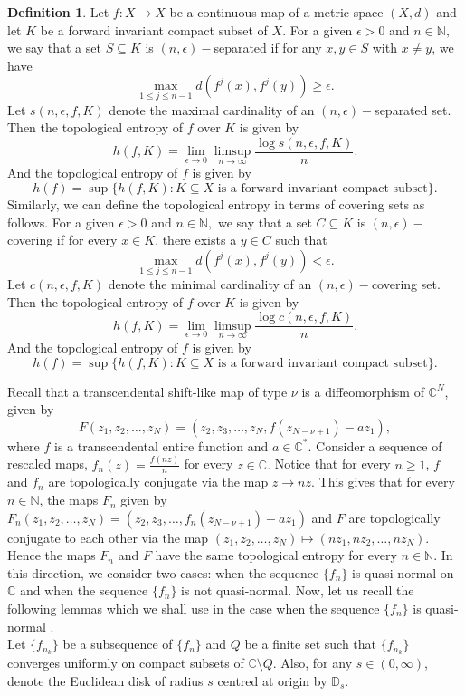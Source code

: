 \documentclass[12pt, reqno]{amsart}
\numberwithin{equation}{section}
\theoremstyle{definition}
\newtheorem{definition}{Definition}[section]
\theoremstyle{remark}
\theoremstyle{plain}
\theoremstyle{definition}
\numberwithin{equation}{section}
\begin{document}
\begin{definition}\cite{Adler, Canvos}
Let $f: X\to X$ be a continuous map of a metric space $(X, d)$ and let $K$ be a forward invariant compact subset of $X$. For a given $\epsilon >0$ and $n\in\mathbb{N},$ we say that a set $S\subseteq K$ is $(n,\epsilon)-$separated if for any $x, y\in S$ with $x\not= y$, we have 
\[\max_{1\leq j\leq n-1}d(f^{j}(x), f^j(y))\geq \epsilon.\]
Let $s(n, \epsilon, f,K)$ denote the maximal cardinality of an $(n,\epsilon)-$separated set. Then the topological entropy of $f$ over $K$ is given by 
\[h(f,K)=\lim_{\epsilon\to 0}\limsup_{n\to\infty}\frac{\log s(n, \epsilon, f,K)}{n}.\]
And the topological entropy of $f$ is given by 
\[h(f)=\sup\{h(f,K): K\subseteq X \text{ is a forward invariant compact subset}\}.\]
Similarly, we can define the topological entropy in terms of covering sets as follows.
For a given $\epsilon >0$ and $n\in\mathbb{N},$ we say that a set $C\subseteq K$ is $(n,\epsilon)-$covering if for every $x\in K$, there exists a $y\in C$ such that
\[\max_{1\leq j\leq n-1}d(f^{j}(x), f^j(y))< \epsilon.\]
Let $c(n,\epsilon, f,K)$ denote the minimal cardinality of an $(n,\epsilon)-$covering set. Then the topological entropy of $f$ over $K$ is given by 
\[h(f,K)=\lim_{\epsilon\to 0}\limsup_{n\to\infty}\frac{\log c(n, \epsilon, f,K)}{n}.\]
And the topological entropy of $f$ is given by 
\[h(f)=\sup\{h(f,K): K\subseteq X \text{ is a forward invariant compact subset}\}.\]
\end{definition}

Recall that a transcendental shift-like map of type $\nu$ is a diffeomorphism of $\mathbb{C}^N$, given by
\begin{equation}\label{3}
F(z_1,z_2,\dots,z_N)=(z_2,z_3,\dots, z_N, f(z_{N-\nu+1})-az_1),
\end{equation}
where $f$ is a transcendental entire function and $a\in\mathbb{C}^*.$ Consider a sequence of rescaled maps,  $f_n(z)=\frac{f(nz)}{n}$ for every $z\in\mathbb{C}.$ Notice that for every $n\geq 1$, $f$ and $f_n$ are topologically conjugate via the map $z\to nz$. This gives that for every $n\in\mathbb{N}$, the maps $F_n$ given by $F_n(z_1,z_2,\dots, z_N)=(z_2,z_3,\dots, f_n(z_{N-\nu+1})-az_1)$ and $F$ are topologically conjugate to each other via the map $(z_1,z_2,\dots, z_N)\mapsto (nz_1,nz_2,\dots,n z_N)$. Hence the maps $F_n$ and $F$ have the same topological entropy for every $n\in\mathbb{N}$. In this direction, we consider two cases: when the sequence $\{f_n\}$ is quasi-normal on $\mathbb{C}$ and when the sequence $\{f_n\}$ is not quasi-normal.
Now, let us recall the following lemmas which we shall use in the case when the sequence $\{f_n\}$ is quasi-normal \cite{Arosio3}.\\
\indent Let $\{f_{n_k}\}$ be  a subsequence of $\{f_n\}$ and $Q$ be a finite set such that $\{f_{n_k}\}$ converges uniformly on compact subsets of $\mathbb{C}\setminus Q.$ Also, for any $s\in (0, \infty)$, denote the Euclidean disk of radius $s$ centred at origin by $\mathbb{D}_s$.
\end{document}
